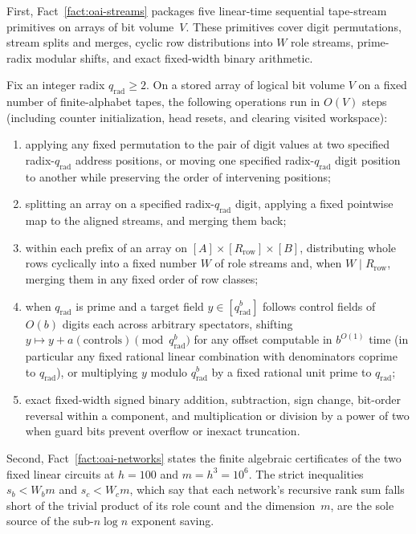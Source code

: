 First, Fact~\ref{fact:oai-streams} packages five linear-time sequential tape-stream primitives on arrays of bit volume~$V$. These primitives cover digit permutations, stream splits and merges, cyclic row distributions into $W$ role streams, prime-radix modular shifts, and exact fixed-width binary arithmetic.

\begin{fact}\label{fact:oai-streams}
Fix an integer radix $q_{\mathrm{rad}}\ge 2$. On a stored array of logical bit volume $V$ on a fixed number of
finite-alphabet tapes, the following operations run in $O(V)$ steps (including counter initialization, head resets, and
clearing visited workspace):
\begin{enumerate}[label=(\arabic*),nosep,leftmargin=*]
  \item applying any fixed permutation to the pair of digit values at two specified radix-$q_{\mathrm{rad}}$ address
    positions, or moving one specified radix-$q_{\mathrm{rad}}$ digit position to another while preserving the order of
    intervening positions;
  \item splitting an array on a specified radix-$q_{\mathrm{rad}}$ digit, applying a fixed pointwise map to the aligned
    streams, and merging them back;
  \item within each prefix of an array on $[A]\times[R_{\mathrm{row}}]\times[B]$, distributing whole rows cyclically
    into a fixed number $W$ of role streams and, when $W\mid R_{\mathrm{row}}$, merging them in any fixed order of row
    classes;
  \item when $q_{\mathrm{rad}}$ is prime and a target field $y\in[q_{\mathrm{rad}}^b]$ follows control fields of
    $O(b)$ digits each across arbitrary spectators, shifting $y\mapsto y+a(\mathrm{controls})\pmod{q_{\mathrm{rad}}^b}$
    for any offset computable in $b^{O(1)}$ time (in particular any fixed rational linear combination with denominators
    coprime to $q_{\mathrm{rad}}$), or multiplying $y$ modulo $q_{\mathrm{rad}}^b$ by a fixed rational unit prime to
    $q_{\mathrm{rad}}$;
  \item exact fixed-width signed binary addition, subtraction, sign change, bit-order reversal within a component, and
    multiplication or division by a power of two when guard bits prevent overflow or inexact truncation.
\end{enumerate}
\end{fact}

Second, Fact~\ref{fact:oai-networks} states the finite algebraic certificates of the two fixed linear circuits at $h=100$ and $m=h^3=10^6$. The strict inequalities $s_b<W_b m$ and $s_c<W_c m$, which say that each network's recursive rank sum falls short of the trivial product of its role count and the dimension~$m$, are the sole source of the sub-$n\log n$ exponent saving.

